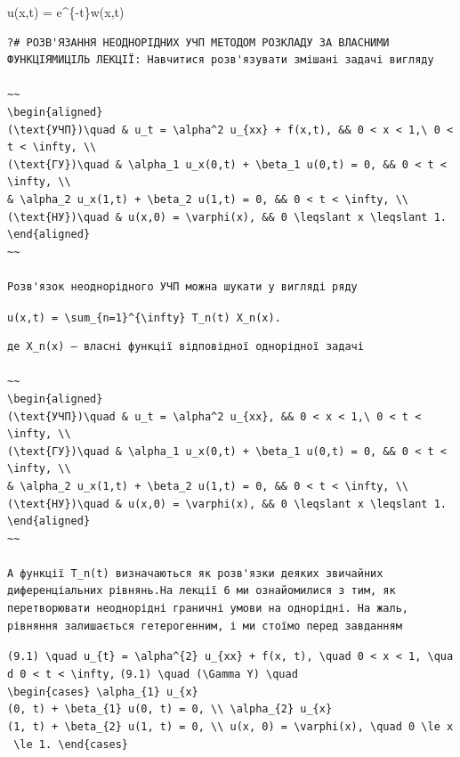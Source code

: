 \documentclass[
  ukrainian,
]{article}
\begin{document}
u(x,t) = e\^{}\{-t\}w(x,t)

\begin{verbatim}
?# РОЗВ'ЯЗАННЯ НЕОДНОРІДНИХ УЧП МЕТОДОМ РОЗКЛАДУ ЗА ВЛАСНИМИ ФУНКЦІЯМИЦІЛЬ ЛЕКЦІЇ: Навчитися розв'язувати змішані задачі вигляду

~~
\begin{aligned}
(\text{УЧП})\quad & u_t = \alpha^2 u_{xx} + f(x,t), && 0 < x < 1,\ 0 < t < \infty, \\
(\text{ГУ})\quad & \alpha_1 u_x(0,t) + \beta_1 u(0,t) = 0, && 0 < t < \infty, \\
& \alpha_2 u_x(1,t) + \beta_2 u(1,t) = 0, && 0 < t < \infty, \\
(\text{НУ})\quad & u(x,0) = \varphi(x), && 0 \leqslant x \leqslant 1.
\end{aligned}
~~

Розв'язок неоднорідного УЧП можна шукати у вигляді ряду
\end{verbatim}

\texttt{u(x,t)\ =\ \textbackslash{}sum\_\{n=1\}\^{}\{\textbackslash{}infty\}\ T\_n(t)\ X\_n(x).}

\begin{verbatim}
де X_n(x) — власні функції відповідної однорідної задачі

~~
\begin{aligned}
(\text{УЧП})\quad & u_t = \alpha^2 u_{xx}, && 0 < x < 1,\ 0 < t < \infty, \\
(\text{ГУ})\quad & \alpha_1 u_x(0,t) + \beta_1 u(0,t) = 0, && 0 < t < \infty, \\
& \alpha_2 u_x(1,t) + \beta_2 u(1,t) = 0, && 0 < t < \infty, \\
(\text{НУ})\quad & u(x,0) = \varphi(x), && 0 \leqslant x \leqslant 1.
\end{aligned}
~~

А функції T_n(t) визначаються як розв'язки деяких звичайних диференціальних рівнянь.На лекції 6 ми ознайомилися з тим, як перетворювати неоднорідні граничні умови на однорідні. На жаль, рівняння залишається гетерогенним, і ми стоїмо перед завданням
\end{verbatim}

\texttt{(9.1)\ \textbackslash{}quad\ u\_\{t\}\ =\ \textbackslash{}alpha\^{}\{2\}\ u\_\{xx\}\ +\ f(x,\ t),\ \textbackslash{}quad\ 0\ \textless{}\ x\ \textless{}\ 1,\ \textbackslash{}quad\ 0\ \textless{}\ t\ \textless{}\ \textbackslash{}infty,}
\texttt{(9.1)\ \textbackslash{}quad\ (\textbackslash{}Gamma\ Y)\ \textbackslash{}quad}
\texttt{\textbackslash{}begin\{cases\}\ \textbackslash{}alpha\_\{1\}\ u\_\{x\}(0,\ t)\ +\ \textbackslash{}beta\_\{1\}\ u(0,\ t)\ =\ 0,\ \textbackslash{}\textbackslash{}\ \textbackslash{}alpha\_\{2\}\ u\_\{x\}(1,\ t)\ +\ \textbackslash{}beta\_\{2\}\ u(1,\ t)\ =\ 0,\ \textbackslash{}\textbackslash{}\ u(x,\ 0)\ =\ \textbackslash{}varphi(x),\ \textbackslash{}quad\ 0\ \textbackslash{}le\ x\ \textbackslash{}le\ 1.\ \textbackslash{}end\{cases\}}
\end{document}
